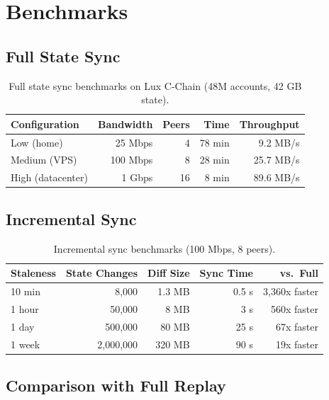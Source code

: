 \section{Benchmarks}
\label{sec:benchmarks}

\subsection{Full State Sync}

\begin{table}[H]
\centering
\caption{Full state sync benchmarks on Lux C-Chain (48M accounts, 42 GB state).}
\label{tab:bench_full}
\begin{tabular}{lrrrr}
\toprule
\textbf{Configuration} & \textbf{Bandwidth} & \textbf{Peers} & \textbf{Time} & \textbf{Throughput} \\
\midrule
Low (home) & 25 Mbps & 4 & 78 min & 9.2 MB/s \\
Medium (VPS) & 100 Mbps & 8 & 28 min & 25.7 MB/s \\
High (datacenter) & 1 Gbps & 16 & 8 min & 89.6 MB/s \\
\bottomrule
\end{tabular}
\end{table}

\subsection{Incremental Sync}

\begin{table}[H]
\centering
\caption{Incremental sync benchmarks (100 Mbps, 8 peers).}
\label{tab:bench_incr}
\begin{tabular}{lrrrr}
\toprule
\textbf{Staleness} & \textbf{State Changes} & \textbf{Diff Size} & \textbf{Sync Time} & \textbf{vs.\ Full} \\
\midrule
10 min & 8,000 & 1.3 MB & 0.5 s & 3{,}360x faster \\
1 hour & 50,000 & 8 MB & 3 s & 560x faster \\
1 day & 500,000 & 80 MB & 25 s & 67x faster \\
1 week & 2,000,000 & 320 MB & 90 s & 19x faster \\
\bottomrule
\end{tabular}
\end{table}

\subsection{Comparison with Full Replay}

